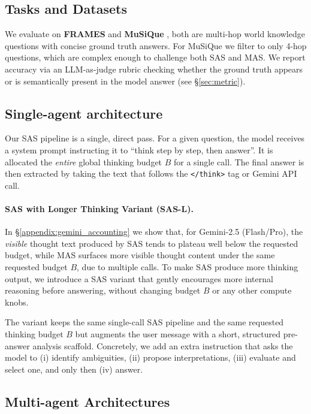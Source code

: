 \documentclass{article} %
\begin{document}
\subsection{Tasks and Datasets}
We evaluate on \textbf{FRAMES} \citep{krishna2025fact} and \textbf{MuSiQue} \citep{trivedi2022musique}, both are multi-hop world knowledge questions with concise ground truth answers. For MuSiQue we filter to only 4-hop questions, which are complex enough to challenge both SAS and MAS. We report accuracy via an LLM-as-judge rubric checking whether the ground truth appears or is semantically present in the model answer (see \S\ref{sec:metric}).

\subsection{Single-agent architecture}

Our SAS pipeline is a single, direct pass. For a given question, the model receives a system prompt instructing it to ``think step by step, then answer''. It is allocated the \emph{entire} global thinking budget $B$ for a single call. The final answer is then extracted by taking the text that follows the \texttt{</think>} tag or Gemini API call.

\paragraph{SAS with Longer Thinking Variant (SAS-L).}
In \S\ref{appendix:gemini_accounting} we show that, for Gemini-2.5 (Flash/Pro), the \emph{visible} thought text produced by SAS tends to plateau well below the requested budget, while MAS surfaces more visible thought content under the same requested budget \(B\), due to multiple calls. To make SAS produce more thinking output, we introduce a SAS variant that gently encourages more internal reasoning before answering, without changing budget \(B\) or any other compute knobs.

The variant keeps the same single-call SAS pipeline and the same requested thinking budget \(B\) but augments the user message with a short, structured pre-answer analysis scaffold. Concretely, we add an extra instruction that asks the model to (i) identify ambiguities, (ii) propose interpretations, (iii) evaluate and select one, and only then (iv) answer.


\subsection{Multi-agent Architectures}
\end{document}

